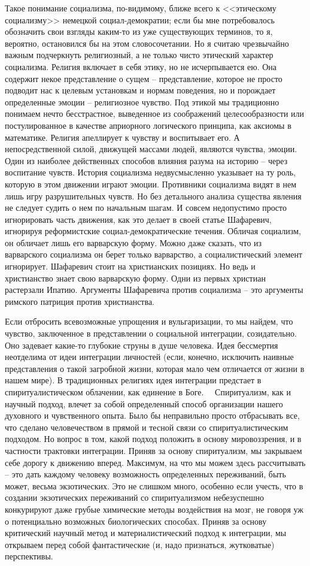 \documentclass{book}
\begin{document}
Такое понимание социализма, по-видимому, ближе всего к <<этическому социализму>> немецкой социал-демократии; если бы мне потребовалось обозначить свои взгляды каким-то из уже существующих терминов, то я, вероятно, остановился бы на этом словосочетании. Но я считаю чрезвычайно важным под­черкнуть религиозный, а не только чисто этический характер социализма. Религия включает в себя этику, но не исчерпывает­ся ею. Она содержит некое представление о сущем -- представ­ление, которое не просто подводит нас к целевым установкам и нормам поведения, но и порождает определенные эмоции -- религиозное чувство. Под этикой мы традиционно понимаем нечто бесстрастное, выведенное из соображений целесообраз­ности или постулированное в качестве априорного логического принципа, как аксиомы в математике. Религия апеллирует к чувству и воспитывает его. А непосредственной силой, движу­щей массами людей, являются чувства, эмоции. Один из наибо­лее действенных способов влияния разума на историю -- через воспитание чувств. История 
социализма недвусмысленно указы­вает на ту роль, которую в этом движении играют эмоции. Про­тивники социализма видят в нем лишь игру разрушительных чувств. Но без детального анализа существа явления не следует судить о нем по начальным шагам. И совсем недопустимо про­сто игнорировать часть движения, как это делает в своей статье Шафаревич, игнорируя реформистские социал-демократические течения. Обличая социализм, он обличает лишь его варварскую форму. Можно даже сказать, что из варварского социализма он берет только варварство, а социалистический элемент игно­рирует. Шафаревич стоит на христианских позициях. Но ведь и христианство знает свою варварскую форму. Одни из первых христиан растерзали Ипатию. Аргументы Шафаревича против социализма -- это аргументы римского патриция против хри­стианства.

Если отбросить всевозможные упрощения и вульгаризации, то мы найдем, что чувство, заключенное в представлении о со­циальной интеграции, созидательно. Оно задевает какие-то глу­бокие струны в душе человека. Идея бессмертия неотделима от идеи интеграции личностей (если, конечно, исключить наив­ные представления о такой загробной жизни, которая мало чем отличается от жизни в нашем мире). В традиционных религиях идея интеграции предстает в спиритуалистическом облачении, как единение в Боге.   Спиритуализм, как и научный подход, влечет за собой определенный способ организации нашего духов­ного и чувственного опыта. Было бы неправильно просто отбра­сывать все, что сделано человечеством в прямой и тесной связи со спиритуалистическим подходом. Но вопрос в том, какой подход положить в основу  мировоззрения, и в частности трактовки интеграции. Приняв за основу спиритуализм, мы закры­ваем себе дорогу к движению вперед. Максимум, на что мы можем здесь рассчитывать -- это дать каждому человеку воз­можность определенных 
переживаний, быть может, весьма экзо­тических. Это не слишком много, особенно если учесть, что в создании экзотических переживаний со спиритуализмом небе­зуспешно конкурируют даже грубые химические методы воз­действия на мозг, не говоря уж о потенциально возможных биологических способах. Приняв за основу критический науч­ный метод и материалистический подход к интеграции, мы открываем перед собой фантастические (и, надо признаться, жутковатые) перспективы.
\end{document}

